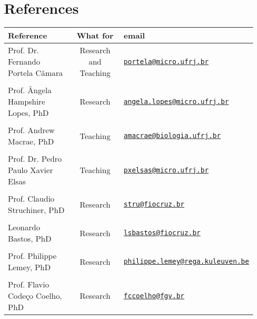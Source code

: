 \documentclass[10pt]{article}
\newcommand\VRule{\color{lightgray}\vrule width 0.5pt}
\begin{document}
\section*{References}
\begin{tabular}{lcl}%
\toprule
Reference & What for & email \\
\midrule
Prof. Dr. Fernando Portela C\^amara&Research and Teaching & \href{mailto:portela@micro.ufrj.br}{\nolinkurl{portela@micro.ufrj.br}}\\
\\
Prof. \^Angela Hampshire Lopes, PhD &Research & \href{mailto:angela.lopes@micro.ufrj.br}{\nolinkurl{angela.lopes@micro.ufrj.br}}\\
\\
Prof. Andrew Macrae, PhD&Teaching & \href{mailto:amacrae@biologia.ufrj.br}{\nolinkurl{amacrae@biologia.ufrj.br}}\\
\\
Prof. Dr. Pedro Paulo Xavier Elsas &Teaching& \href{mailto:pxelsas@micro.ufrj.br}{\nolinkurl{pxelsas@micro.ufrj.br}}\\
\\
Prof. Claudio Struchiner, PhD &Research&  \href{mailto:stru@fiocruz.br}{\nolinkurl{stru@fiocruz.br}} \\
\\
Leonardo Bastos, PhD &Research&  \href{mailto:lsbastos@fiocruz.br}{\nolinkurl{lsbastos@fiocruz.br}} \\
\\
Prof. Philippe Lemey, PhD & Research& \href{mailto:philippe.lemey@rega.kuleuven.be}{\nolinkurl{philippe.lemey@rega.kuleuven.be}}\\
\\
Prof. Flavio Code\c{c}o Coelho, PhD & Research & \href{mailto:fccoelho@fgv.br}{\nolinkurl{fccoelho@fgv.br}}\\
\bottomrule
\end{tabular}
\end{document}
